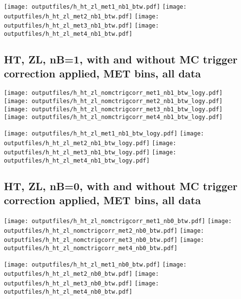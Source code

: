 \documentclass[11pt]{article}
\begin{document}
    \noindent
     \texttt{[image: outputfiles/h\_ht\_zl\_met1\_nb1\_btw.pdf]}
     \texttt{[image: outputfiles/h\_ht\_zl\_met2\_nb1\_btw.pdf]}
     \texttt{[image: outputfiles/h\_ht\_zl\_met3\_nb1\_btw.pdf]}
     \texttt{[image: outputfiles/h\_ht\_zl\_met4\_nb1\_btw.pdf]}

   \clearpage
     \subsection{ HT, ZL, nB=1, with and without MC trigger correction applied, MET bins, all data}

    \noindent
     \texttt{[image: outputfiles/h\_ht\_zl\_nomctrigcorr\_met1\_nb1\_btw\_logy.pdf]}
     \texttt{[image: outputfiles/h\_ht\_zl\_nomctrigcorr\_met2\_nb1\_btw\_logy.pdf]}
     \texttt{[image: outputfiles/h\_ht\_zl\_nomctrigcorr\_met3\_nb1\_btw\_logy.pdf]}
     \texttt{[image: outputfiles/h\_ht\_zl\_nomctrigcorr\_met4\_nb1\_btw\_logy.pdf]}

    \noindent
     \texttt{[image: outputfiles/h\_ht\_zl\_met1\_nb1\_btw\_logy.pdf]}
     \texttt{[image: outputfiles/h\_ht\_zl\_met2\_nb1\_btw\_logy.pdf]}
     \texttt{[image: outputfiles/h\_ht\_zl\_met3\_nb1\_btw\_logy.pdf]}
     \texttt{[image: outputfiles/h\_ht\_zl\_met4\_nb1\_btw\_logy.pdf]}

   \clearpage
     \subsection{ HT, ZL, nB=0, with and without MC trigger correction applied, MET bins, all data}

    \noindent
     \texttt{[image: outputfiles/h\_ht\_zl\_nomctrigcorr\_met1\_nb0\_btw.pdf]}
     \texttt{[image: outputfiles/h\_ht\_zl\_nomctrigcorr\_met2\_nb0\_btw.pdf]}
     \texttt{[image: outputfiles/h\_ht\_zl\_nomctrigcorr\_met3\_nb0\_btw.pdf]}
     \texttt{[image: outputfiles/h\_ht\_zl\_nomctrigcorr\_met4\_nb0\_btw.pdf]}

    \noindent
     \texttt{[image: outputfiles/h\_ht\_zl\_met1\_nb0\_btw.pdf]}
     \texttt{[image: outputfiles/h\_ht\_zl\_met2\_nb0\_btw.pdf]}
     \texttt{[image: outputfiles/h\_ht\_zl\_met3\_nb0\_btw.pdf]}
     \texttt{[image: outputfiles/h\_ht\_zl\_met4\_nb0\_btw.pdf]}
\end{document}

